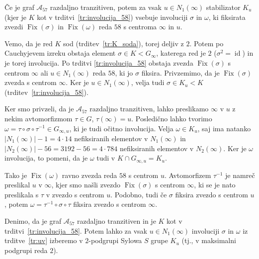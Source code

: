 \documentclass[fin1, tisk]{fmfdelo}
\newcommand{\asch}{\mathscr{A}_{57}}
\newcommand{\fix}{\operatorname{Fix}}
\newcommand{\id}{\operatorname{id}}
\begin{document}
\begin{trditev}\label{tr:uv}
	Če je graf $\asch$ razdaljno tranzitiven, potem za vsak $u\in N_1(\infty)$
    stabilizator $K_{u}$
    (kjer je $K$ kot v trditvi~\ref{tr:involucija_58})
    vsebuje involuciji $\sigma$ in $\omega$, ki fiksirata zvezdi $\fix(\sigma)$ in $\fix(\omega)$ reda $58$
    s centroma $\infty$ in $u$.
\end{trditev}
\begin{dokaz}
    Vemo, da je red $K$ sod (trditev~\ref{tr:K_soda}), torej deljiv z $2$. Potem po 
    Cauchyjevem izreku obstaja element $\sigma\in K < G_{\infty}$, 
    katerega red je $2$ ($\sigma^2 = \id$) in je torej involucija. Po trditvi
    \ref{tr:involucija_58} obstaja zvezda $\fix(\sigma)$ s centrom $\infty$ ali $u\in N_1(\infty)$ 
    reda $58$, ki jo $\sigma$ fiksira. Privzemimo, da je $\fix(\sigma)$ zvezda s centrom $\infty$.
    Ker je $u\in N_1(\infty)$, velja tudi $\sigma \in K_{u}<K$ (trditev~\ref{tr:involucija_58}).

    Ker smo privzeli, da je $\asch$ razdaljno tranzitiven, lahko preslikamo $\infty$ v $u$ z
    nekim avtomorfizmom $\tau \in G$, $\tau(\infty) = u$.
    Posledično lahko tvorimo
    $\omega = \tau \circ \sigma \circ \tau^{-1} \in G_{\infty, u}$, 
    ki je tudi očitno involucija. Velja $\omega \in K_{u}$, 
    saj ima natanko $|N_1(\infty)| - 1 = 4\cdot 14$ nefiksiranih elementov
    v $N_1(\infty)$ in $|N_2(\infty)| - 56 = 3192 - 56 = 4\cdot 784$ nefiksiranih elementov v $N_2(\infty)$.
    Ker je $\omega$ involucija, to pomeni, da je $\omega$ tudi v $K \cap G_{\infty, u} = K_{u}$.

    Tako je $\fix(\omega)$ ravno zvezda reda $58$ s centrom $u$. Avtomorfizem $\tau^{-1}$ je namreč preslikal $u$ v $\infty$, 
    kjer smo našli zvezdo $\fix(\sigma)$ s centrom $\infty$, ki se je nato preslikala s $\tau$ v zvezdo s centrom $u$.
    Podobno, tudi če $\sigma$ fiksira zvezdo s centrom $u$, potem $\omega = \tau^{-1} \circ \sigma \circ \tau$ fiksira zvezdo s centrom $\infty$.
\end{dokaz}

\begin{trditev}
	Denimo, da je graf $\asch$ razdaljno tranzitiven
	in je $K$ kot v tr\-dit\-vi~\ref{tr:involucija_58}.
	Potem lahko za vsak $u \in N_1(\infty)$
    involuciji $\sigma$ in $\omega$ iz trditve~\ref{tr:uv} izberemo v $2$-podgrupi Sylowa
    $S$ grupe $K_{u}$ (tj., v maksimalni podgrupi reda $2$).
\end{trditev}
\end{document}
